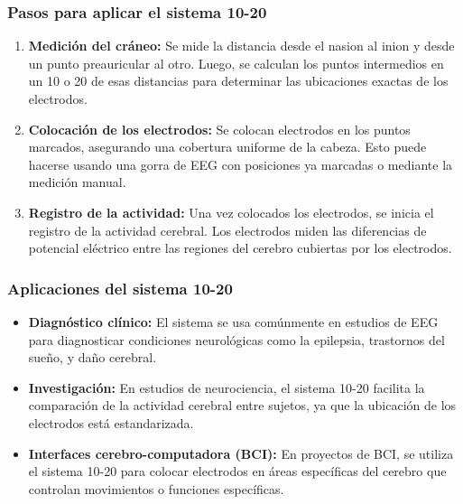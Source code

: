 \documentclass{article}
\begin{document}
\subsubsection{Pasos para aplicar el sistema 10-20}

\begin{enumerate}

    \item \textbf{Medición del cráneo:} Se mide la distancia desde el nasion al inion y desde un punto preauricular al otro. Luego, se calculan los puntos intermedios en un 10 o 20 de esas distancias para determinar las ubicaciones exactas de los electrodos.
    
    \item \textbf{Colocación de los electrodos:} Se colocan electrodos en los puntos marcados, asegurando una cobertura uniforme de la cabeza. Esto puede hacerse usando una gorra de EEG con posiciones ya marcadas o mediante la medición manual.
    
    \item \textbf{Registro de la actividad:} Una vez colocados los electrodos, se inicia el registro de la actividad cerebral. Los electrodos miden las diferencias de potencial eléctrico entre las regiones del cerebro cubiertas por los electrodos.
\end{enumerate}

\subsubsection{Aplicaciones del sistema 10-20}
\begin{itemize}
    \item \textbf{Diagnóstico clínico:} El sistema se usa comúnmente en estudios de EEG para diagnosticar condiciones neurológicas como la epilepsia, trastornos del sueño, y daño cerebral.
    \item \textbf{Investigación:} En estudios de neurociencia, el sistema 10-20 facilita la comparación de la actividad cerebral entre sujetos, ya que la ubicación de los electrodos está estandarizada.
    \item \textbf{Interfaces cerebro-computadora (BCI):} En proyectos de BCI, se utiliza el sistema 10-20 para colocar electrodos en áreas específicas del cerebro que controlan movimientos o funciones específicas.
\end{itemize}
\end{document}
